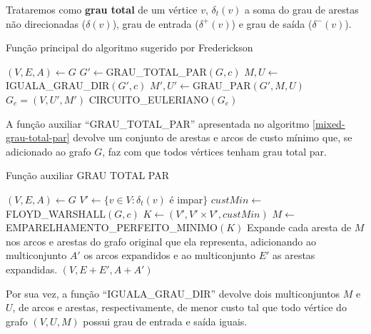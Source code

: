     Trataremos como \textbf{grau total} de um vértice $v$, $\delta_t(v)$ a soma do grau de arestas não direcionadas ($\delta(v)$), grau de entrada ($\delta^+(v)$) e grau de saída ($\delta^-(v)$).

    \begin{algorithm}
    \caption{Função principal do algoritmo sugerido por Frederickson}
    \label{mixed-1}
    \begin{algorithmic}[1]
        \State $(V, E, A) \gets G$ 
        \State $G' \gets $GRAU\_TOTAL\_PAR$(G, c)$ 
        \State $M, U \gets $IGUALA\_GRAU\_DIR$(G', c)$ 
        \State $M', U' \gets $GRAU\_PAR$(G', M, U)$ 
        \State $G_e = (V, U', M')$
        \State \Return CIRCUITO\_EULERIANO$(G_e)$ %
    \EndFunction 
    \end{algorithmic}
    \end{algorithm}

    A função auxiliar ``GRAU\_TOTAL\_PAR'' apresentada no algoritmo \ref{mixed-grau-total-par} devolve um conjunto de arestas e arcos de custo mínimo que, se adicionado ao grafo $G$, faz com que todos vértices tenham grau total par.
    
    \begin{algorithm}
    \caption{Função auxiliar GRAU TOTAL PAR}
    \label{mixed-grau-total-par}
    \begin{algorithmic}[1]
        \State $(V, E, A) \gets G$
        \State $V' \gets \{v \in V : \delta_t(v)$ é impar$\}$
        \State $custMin \gets $ FLOYD\_WARSHALL$(G, c)$ 
        \State $K \gets (V', V' \times V', custMin)$ 
        \State $M \gets $ EMPARELHAMENTO\_PERFEITO\_MINIMO$(K)$
        \State Expande cada aresta de $M$ nos arcos e arestas do grafo original que ela representa, adicionando ao multiconjunto $A'$ os arcos expandidos e ao multiconjunto $E'$ as arestas expandidas.
        \State \Return $(V, E + E', A + A')$ 
    \EndFunction
    \end{algorithmic}
    \end{algorithm}

    Por sua vez, a função ``IGUALA\_GRAU\_DIR'' devolve dois multiconjuntos $M$ e $U$, de arcos e arestas, respectivamente, de menor custo tal que todo vértice do grafo $(V, U, M)$ possui grau de entrada e saída iguais.

